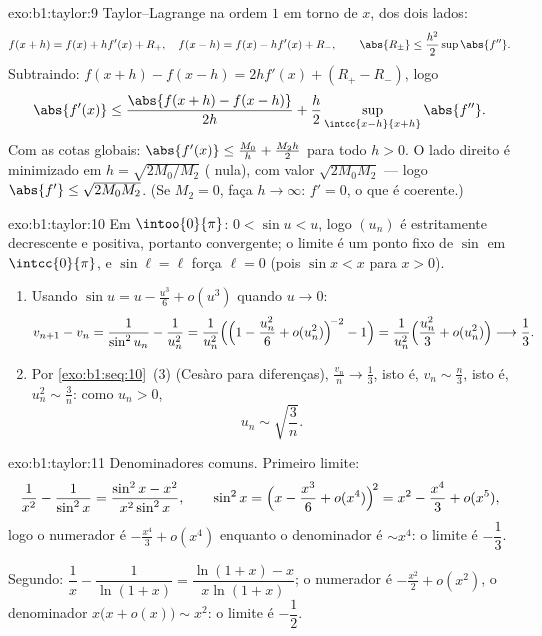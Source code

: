 \begin{solution}{exo:b1:taylor:9}
Taylor--Lagrange na ordem $1$ em torno de $x$, dos dois lados:
\[
f(x + h) = f(x) + h f'(x) + R_+,\quad
f(x - h) = f(x) - h f'(x) + R_-,
\qquad \abs{R_\pm} \leq \frac{h^2}{2} \sup \abs{f''} .
\]
Subtraindo: $f(x+h) - f(x-h) = 2h f'(x) + (R_+ - R_-)$, logo
\[
\abs{f'(x)} \leq \frac{\abs{f(x+h) - f(x-h)}}{2h} +
\frac{h}{2}\sup_{\intcc{x-h}{x+h}}\abs{f''} .
\]
Com as cotas globais: $\abs{f'(x)} \leq \frac{M_0}{h} + \frac{M_2
h}{2}$ para todo $h > 0$. O lado direito é
minimizado em $h =
\sqrt{2M_0/M_2}$ ( nula), com valor $\sqrt{2M_0M_2}$
--- logo $\abs{f'} \leq \sqrt{2M_0M_2}$. (Se $M_2 = 0$, faça $h \to
\infty$: $f' = 0$, o que é
coerente.)
\end{solution}

\begin{solution}{exo:b1:taylor:10}
Em $\intoo{0}{\pi}$: $0 < \sin u < u$, logo $(u_n)$ é estritamente
decrescente e positiva, portanto convergente; o limite é um ponto fixo
de $\sin$ em $\intcc{0}{\pi}$, e $\sin \ell = \ell$ força $\ell =
0$ (pois $\sin x < x$ para $x > 0$).
\begin{enumerate}
  \item Usando $\sin u = u - \frac{u^3}{6} + o(u^3)$ quando $u \to 0$:
        \[
        v_{n+1} - v_n = \frac{1}{\sin^2 u_n} - \frac{1}{u_n^2}
        = \frac{1}{u_n^2}\Bigl(\Bigl(1 - \frac{u_n^2}{6} +
        o(u_n^2)\Bigr)^{\!-2} - 1\Bigr)
        = \frac{1}{u_n^2}\Bigl(\frac{u_n^2}{3} + o(u_n^2)\Bigr)
        \longrightarrow \frac13 .
        \]
  \item Por \cref{exo:b1:seq:10}~(3) (Cesàro para diferenças),
        $\frac{v_n}{n} \to \frac13$, isto é, $v_n \sim \frac n3$, isto é,
        $u_n^2 \sim \frac 3n$: como $u_n > 0$,
        \[
        u_n \sim \sqrt{\frac{3}{n}} .
        \]
\end{enumerate}
\end{solution}

\begin{solution}{exo:b1:taylor:11}
Denominadores comuns. Primeiro limite:
\[
\frac{1}{x^2} - \frac{1}{\sin^2 x}
= \frac{\sin^2 x - x^2}{x^2\sin^2 x},
\qquad
\sin^2 x = \Bigl(x - \frac{x^3}{6} + o(x^4)\Bigr)^{\!2}
= x^2 - \frac{x^4}{3} + o(x^5) ,
\]
logo o numerador é $-\frac{x^4}{3} + o(x^4)$ enquanto o
denominador é $\sim x^4$: o limite é $-\dfrac13$.

Segundo: $\dfrac1x - \dfrac{1}{\ln(1+x)} = \dfrac{\ln(1+x) -
x}{x\ln(1+x)}$; o numerador é $-\frac{x^2}{2} + o(x^2)$, o
denominador $x\bigl(x + o(x)\bigr) \sim x^2$: o limite é
$-\dfrac12$.
\end{solution}

